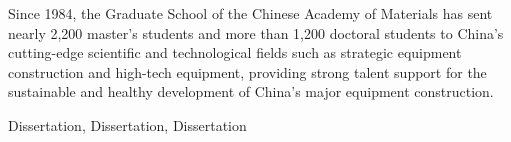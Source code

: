 Since 1984, the Graduate School of the Chinese Academy of Materials has sent nearly 2,200 master's students and more than 1,200 doctoral students to China's cutting-edge scientific and technological fields such as strategic equipment construction and high-tech equipment, providing strong talent support for the sustainable and healthy development of China's major equipment construction.
\vspace{\baselineskip}

\hangindent=60pt\noindent
{  Dissertation,       Dissertation,       Dissertation } %
\clearpage

